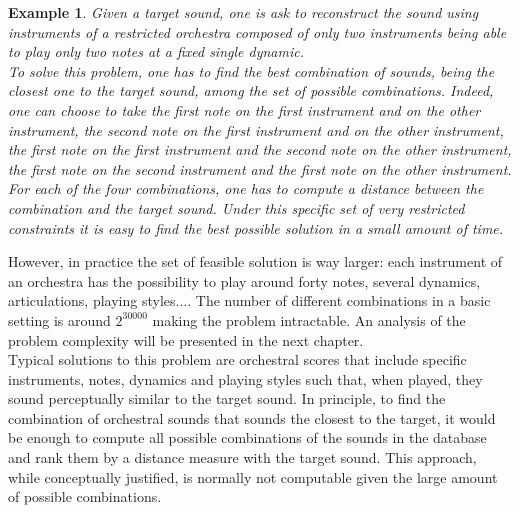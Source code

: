 \documentclass[a4paper]{book}
\newtheorem{ex}{Example}[chapter]
\begin{document}
\begin{ex}
Given a target sound, one is ask to reconstruct the sound using instruments of a restricted orchestra composed of only two instruments being able to play only two notes at a fixed single dynamic. \\
To solve this problem, one has to find the best combination of sounds, being the closest one to the target sound, among the set of possible combinations. Indeed, one can choose to take the first note on the first instrument and on the other instrument, the second note on the first instrument and on the other instrument, the first note on the first instrument and the second note on the other instrument, the first note on the second instrument and the first note on the other instrument.
For each of the four combinations, one has to compute a distance between the combination and the target sound. Under this specific set of very restricted constraints it is easy to find the best possible solution in a small amount of time. \\
\end{ex}
However, in practice the set of feasible solution is way larger: each instrument of an orchestra has the possibility to play around forty notes, several dynamics, articulations, playing styles$\ldots$. The number of different combinations in a basic setting is around $2^{30000}$ making the problem intractable. An analysis of the problem complexity will be presented in the next chapter.\\
Typical solutions to this problem are orchestral scores that include specific instruments, notes, dynamics and playing styles such that, when played, they sound perceptually similar to the target sound. In principle, to find the combination of orchestral sounds that sounds the closest to the target, it would be enough to compute all possible combinations of the sounds in the database and rank them by a distance measure with the target sound. This approach, while conceptually justified, is normally not computable given the large amount of possible combinations.\\
\end{document}
